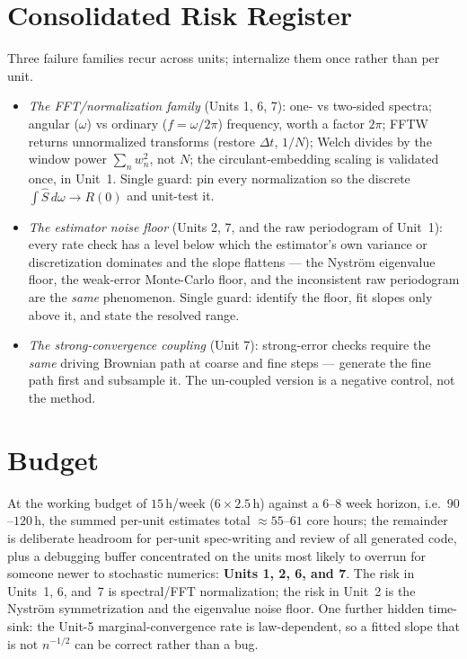 \documentclass[11pt]{article}
\begin{document}
\section{Consolidated Risk Register}
\label{sec:risk}

Three failure families recur across units; internalize them once rather than per unit.

\begin{itemize}[leftmargin=1.4cm]
  \item \emph{The FFT/normalization family} (Units 1, 6, 7): one- vs two-sided spectra; angular
  ($\omega$) vs ordinary ($f=\omega/2\pi$) frequency, worth a factor $2\pi$; FFTW returns unnormalized
  transforms (restore $\Delta t$, $1/N$); Welch divides by the window power $\sum_n w_n^2$, not $N$;
  the circulant-embedding scaling is validated once, in Unit~1. Single guard: pin every normalization
  so the discrete $\int\widehat S\,d\omega\to R(0)$ and unit-test it.
  \item \emph{The estimator noise floor} (Units 2, 7, and the raw periodogram of Unit~1): every rate
  check has a level below which the estimator's own variance or discretization dominates and the slope
  flattens --- the Nystr\"om eigenvalue floor, the weak-error Monte-Carlo floor, and the inconsistent
  raw periodogram are the \emph{same} phenomenon. Single guard: identify the floor, fit slopes only
  above it, and state the resolved range.
  \item \emph{The strong-convergence coupling} (Unit 7): strong-error checks require the \emph{same}
  driving Brownian path at coarse and fine steps --- generate the fine path first and subsample it.
  The un-coupled version is a negative control, not the method.
\end{itemize}

\section{Budget}
\label{sec:budget}

At the working budget of $15$\,h/week ($6\times2.5$\,h) against a $6$--$8$ week horizon, i.e.\
$90$--$120$\,h, the summed per-unit estimates total $\approx 55$--$61$ core hours; the remainder is
deliberate headroom for per-unit spec-writing and review of all generated code, plus a debugging
buffer concentrated on the units most likely to overrun for someone newer to stochastic numerics:
\textbf{Units 1, 2, 6, and 7}. The risk in Units~1, 6, and~7 is spectral/FFT normalization; the risk
in Unit~2 is the Nystr\"om symmetrization and the eigenvalue noise floor. One further hidden time-sink:
the Unit-5 marginal-convergence rate is law-dependent, so a fitted slope that is not $n^{-1/2}$ can be
correct rather than a bug.
\end{document}
